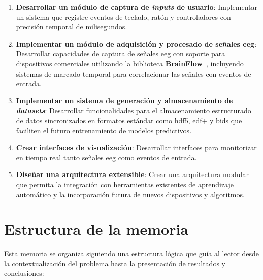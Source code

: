 \begin{enumerate}
    \item \textbf{Desarrollar un módulo de captura de \textit{inputs} de usuario}: Implementar un sistema que registre eventos de teclado, ratón y controladores con precisión temporal de milisegundos.

    \item \textbf{Implementar un módulo de adquisición y procesado de señales \acrshort{eeg}}: Desarrollar capacidades de captura de señales \acrshort{eeg} con soporte para dispositivos comerciales utilizando la biblioteca \textbf{BrainFlow}~\cite{brainflow}, incluyendo sistemas de marcado temporal para correlacionar las señales con eventos de entrada.

    \item \textbf{Implementar un sistema de generación y almacenamiento de \textit{\glspl{dataset}}}: Desarrollar funcionalidades para el almacenamiento estructurado de datos sincronizados en formatos estándar como \acrshort{hdf5}, \acrshort{edf+} y \acrshort{bids} que faciliten el futuro entrenamiento de modelos predictivos.

    \item \textbf{Crear interfaces de visualización}: Desarrollar interfaces para monitorizar en tiempo real tanto señales \acrshort{eeg} como eventos de entrada.

    \item \textbf{Diseñar una arquitectura extensible}: Crear una arquitectura modular que permita la integración con herramientas existentes de aprendizaje automático y la incorporación futura de nuevos dispositivos y algoritmos.
\end{enumerate}

\section{Estructura de la memoria}
\label{sec:estructura}

Esta memoria se organiza siguiendo una estructura lógica que guía al lector desde la contextualización del problema hasta la presentación de resultados y conclusiones:

